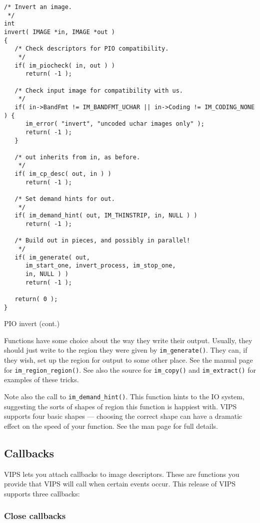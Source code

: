 \begin{fig2}
\begin{verbatim}
/* Invert an image.
 */
int
invert( IMAGE *in, IMAGE *out )
{
   /* Check descriptors for PIO compatibility.
    */
   if( im_piocheck( in, out ) )
      return( -1 );

   /* Check input image for compatibility with us.
    */
   if( in->BandFmt != IM_BANDFMT_UCHAR || in->Coding != IM_CODING_NONE ) {
      im_error( "invert", "uncoded uchar images only" );
      return( -1 );
   }

   /* out inherits from in, as before.
    */
   if( im_cp_desc( out, in ) )
      return( -1 );

   /* Set demand hints for out.
    */
   if( im_demand_hint( out, IM_THINSTRIP, in, NULL ) )
      return( -1 );

   /* Build out in pieces, and possibly in parallel!
    */
   if( im_generate( out,
      im_start_one, invert_process, im_stop_one,
      in, NULL ) )
      return( -1 );

   return( 0 );
}    
\end{verbatim}
\caption{PIO invert (cont.)}
\end{fig2}

Functions have some choice about the way they write their output. Usually, they
should just write to the region they were given by \verb+im_generate()+. They
can, if they wish, set up the region for output to some other place. See
the manual page for \verb+im_region_region()+.  See also the source for
\verb+im_copy()+ and \verb+im_extract()+ for examples of these tricks.

Note also the call to \verb+im_demand_hint()+. This function hints to the IO
system, suggesting the sorts of shapes of region this function is happiest
with. VIPS supports four basic shapes --- choosing the correct shape can
have a dramatic effect on the speed of your function. See the man page for
full details.

\subsection{Callbacks}
\label{sec:callback}

VIPS lets you attach callbacks to image descriptors. These are functions
you provide that VIPS will call when certain events occur. This release
of VIPS supports three callbacks:

\subsubsection{Close callbacks}

